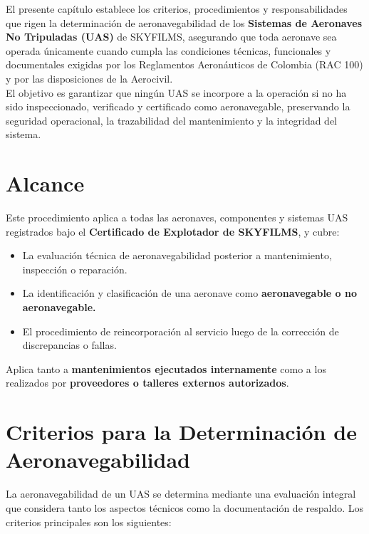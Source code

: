 

El presente capítulo establece los criterios, procedimientos y responsabilidades que rigen la determinación de aeronavegabilidad de los \textbf{Sistemas de Aeronaves No Tripuladas (UAS)} de SKYFILMS, asegurando que toda aeronave sea operada únicamente cuando cumpla las condiciones técnicas, funcionales y documentales exigidas por los Reglamentos Aeronáuticos de Colombia (RAC 100) y por las disposiciones de la Aerocivil.\\

El objetivo es garantizar que ningún UAS se incorpore a la operación si no ha sido inspeccionado, verificado y certificado como aeronavegable, preservando la seguridad operacional, la trazabilidad del mantenimiento y la integridad del sistema.

\section{Alcance}
Este procedimiento aplica a todas las aeronaves, componentes y sistemas UAS registrados bajo el \textbf{Certificado de Explotador de SKYFILMS}, y cubre:

\begin{itemize}
    \item La evaluación técnica de aeronavegabilidad posterior a mantenimiento, inspección o reparación.

    \item La identificación y clasificación de una aeronave como \textbf{aeronavegable o no aeronavegable.}

    \item El procedimiento de reincorporación al servicio luego de la corrección de discrepancias o fallas.
\end{itemize}

Aplica tanto a \textbf{mantenimientos ejecutados internamente} como a los realizados por \textbf{proveedores o talleres externos autorizados}.

\section{Criterios para la Determinación de Aeronavegabilidad}

La aeronavegabilidad de un UAS se determina mediante una evaluación integral que considera tanto los aspectos técnicos como la documentación de respaldo. Los criterios principales son los siguientes:

